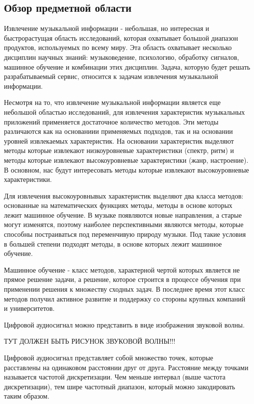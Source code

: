 \subsection{Обзор предметной области}
\label{sec:analysis:literature}

Извлечение музыкальной информации - небольшая, но интересная и быстрорастущая область исследований, которая охватывает большой диапазон продуктов, используемых по всему миру. Эта область охватывает несколько дисциплин научных знаний: музыковедение, психологию, обработку сигналов, машинное обучение и комбинации этих дисциплин. Задача, которую будет решать разрабатываемый сервис, относится к задачам извлечения музыкальной информации.

Несмотря на то, что извлечение музыкальной информации является еще небольшой областью исследований, для извлечения характеристик музыкальных приложений применяется достаточное количество методов. Эти методы различаются как на основаниии применяемых подходов, так и на основании уровней извлекаемых характеристик. На основании характеристик выделяют методы которые извлекают низкоуровневые характеристики (спектр, ритм) и методы которые извлекают высокоуровневые характеристики (жанр, настроение). В основном, нас будут интересовать методы которые извлекают высокоуровневые характеристики.

Для извлечения высокоуровнывых характеристик выделяют два класса методов: основанные на математических функциях методы, методы в основе которых лежит машинное обучение. В музыке появляются новые направления, а старые могут изменятся, поэтому наиболее перспективными являются методы, которые способны постраиваться под переменчивую природу музыки. Под такие условия в большей степени подходят методы, в основе которых лежит машинное обучение.

Машинное обучение - класс методов, характерной чертой которых является не прямое решение задачи, а решение, которое строится в процессе обучения при применении решения к множеству сходных задач. В последнее время этот класс методов получил активное развитие и поддержку со стороны крупных компаний и университетов.

Цифровой аудиосигнал можно представить в виде изображения звуковой волны.

ТУТ ДОЛЖЕН БЫТЬ РИСУНОК ЗВУКОВОЙ ВОЛНЫ!!!

Цифровой аудиосигнал представляет собой множество точек, которые расставлены на одинаковом расстоянии друг от друга. Расстояние между точками называется частотой дискретизации. Чем меньше интервал (выше частота дискретизации), тем шире частотный диапазон, который можно закодировать таким образом.

